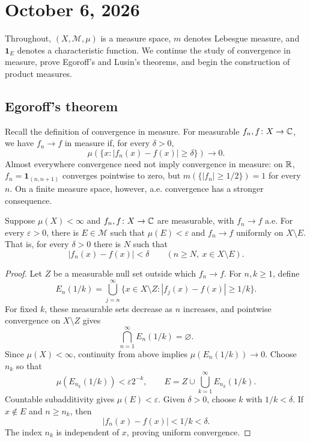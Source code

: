 \section{October 6, 2026}

Throughout, $(X,\mathcal M,\mu)$ is a measure space, $m$ denotes
Lebesgue measure, and $\mathbf 1_E$ denotes a characteristic function.
We continue the study of convergence in measure, prove Egoroff's and
Lusin's theorems, and begin the construction of product measures.

\subsection{Egoroff's theorem}

Recall the definition of convergence in measure. For measurable
$f_n,f\colon X\to\mathbb{C}$, we have $f_n\to f$ in measure if, for
every $\delta>0$,
\[
  \mu(\{x:|f_n(x)-f(x)|\geq\delta\})\longrightarrow0.
\]
Almost everywhere convergence need not imply convergence in measure:
on $\mathbb{R}$, $f_n=\mathbf 1_{(n,n+1)}$ converges pointwise to zero,
but $m(\{|f_n|\geq1/2\})=1$ for every $n$. On a finite measure
space, however, a.e. convergence has a stronger consequence.

\begin{theorem}\label{thm:egoroff-oct-06}
  Suppose $\mu(X)<\infty$ and $f_n,f\colon X\to\mathbb{C}$ are
  measurable, with $f_n\to f$ a.e. For every $\varepsilon>0$,
  there is $E\in\mathcal M$ such that $\mu(E)<\varepsilon$ and
  $f_n\to f$ uniformly on $X\setminus E$. That is, for every
  $\delta>0$ there is $N$ such that
  \[
    |f_n(x)-f(x)|<\delta
    \qquad(n\geq N,\ x\in X\setminus E).
  \]
\end{theorem}

\begin{proof}
  Let $Z$ be a measurable null set outside which $f_n\to f$.
  For $n,k\geq1$, define
  \[
    E_n(1/k)=\bigcup_{j=n}^{\infty}
      \{x\in X\setminus Z:|f_j(x)-f(x)|\geq1/k\}.
  \]
  For fixed $k$, these measurable sets decrease as $n$ increases,
  and pointwise convergence on $X\setminus Z$ gives
  \[
    \bigcap_{n=1}^{\infty}E_n(1/k)=\varnothing.
  \]
  Since $\mu(X)<\infty$, continuity from above implies
  $\mu(E_n(1/k))\to0$. Choose $n_k$ so that
  \[
    \mu(E_{n_k}(1/k))<\varepsilon 2^{-k},
    \qquad
    E=Z\cup\bigcup_{k=1}^{\infty}E_{n_k}(1/k).
  \]
  Countable subadditivity gives $\mu(E)<\varepsilon$. Given
  $\delta>0$, choose $k$ with $1/k<\delta$. If $x\notin E$ and
  $n\geq n_k$, then
  \[
    |f_n(x)-f(x)|<1/k<\delta.
  \]
  The index $n_k$ is independent of $x$, proving uniform convergence.
\end{proof}

